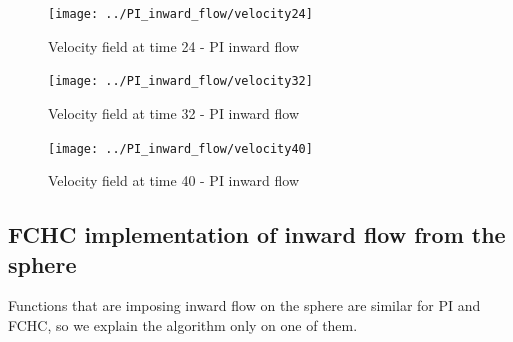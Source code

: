 \begin{figure}[htbp] 
 \centering 
 \texttt{[image: ../PI\_inward\_flow/velocity24]}
 \caption{Velocity field at time 24 - PI inward flow}
\end{figure}


\begin{figure}[htbp] 
 \centering 
 \texttt{[image: ../PI\_inward\_flow/velocity32]}
 \caption{Velocity field at time 32 - PI inward flow}
\end{figure}


\begin{figure}[htbp] 
 \centering 
 \texttt{[image: ../PI\_inward\_flow/velocity40]}
 \caption{Velocity field at time 40 - PI inward flow}
\end{figure}


\subsection{FCHC implementation of inward flow from the sphere}

Functions that are imposing inward flow on the sphere are similar for PI and FCHC,
so we explain the algorithm only on one of them.

